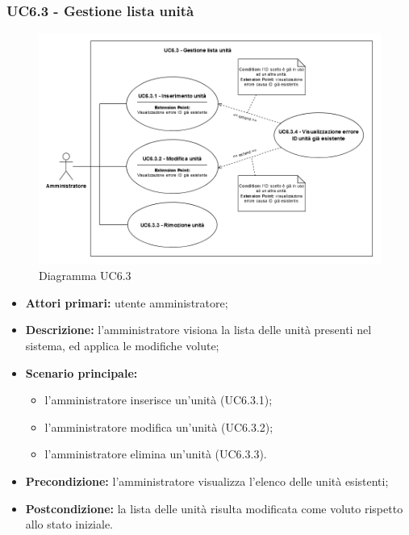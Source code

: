\subsubsection{UC6.3 - Gestione lista unità}
	\begin{center}
		\begin{figure}[h!]
			\includegraphics[width=15cm]{images/uc6.3.png}
			\caption{Diagramma UC6.3}
		\end{figure}
	\end{center}
	\begin{itemize}
		\item \textbf{Attori primari:} utente amministratore;
		\item \textbf{Descrizione:} l'amministratore visiona la lista delle unità presenti nel sistema, ed applica le modifiche volute;
		\item \textbf{Scenario principale:} 
			\begin{itemize}
				\item l'amministratore inserisce un'unità (UC6.3.1);
				\item l'amministratore modifica un'unità (UC6.3.2);
				\item l'amministratore elimina un'unità (UC6.3.3).
			\end{itemize}
		\item \textbf{Precondizione:} l'amministratore visualizza l'elenco delle unità esistenti;
		\item \textbf{Postcondizione:} la lista delle unità risulta modificata come voluto rispetto allo stato iniziale.
	\end{itemize}

